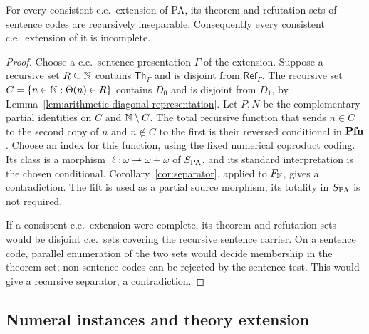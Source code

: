 \begin{corollary}
\label{cor:arithmetic}
\label{thm:arithmetic-comparison-inseparability}
For every consistent c.e.\ extension of PA, its theorem and
refutation sets of sentence codes are recursively inseparable.
Consequently every consistent c.e.\ extension of it is incomplete.
\end{corollary}
\begin{proof}
Choose a c.e.\ sentence presentation $\Gamma$ of the extension.
Suppose a recursive set $R\subseteq\mathbb N$ contains
$\mathsf{Th}_\Gamma$ and is disjoint from
$\mathsf{Ref}_\Gamma$. The recursive set
$C=\{n\in\mathbb N:\Theta(n)\in R\}$
contains $D_0$ and is disjoint from $D_1$, by
Lemma~\ref{lem:arithmetic-diagonal-representation}.
Let $P,N$ be the complementary partial identities on $C$ and
$\mathbb N\setminus C$. The total recursive function that sends
$n\in C$ to the second copy of $n$ and $n\notin C$ to the
first is their reversed conditional in $\mathbf{Pfn}$.
Choose an index for this function, using the fixed numerical
coproduct coding. Its class is a morphism
$\ell:\omega\rightharpoonup\omega+\omega$ of $S_{\mathrm{PA}}$,
and its standard interpretation is the chosen conditional.
Corollary~\ref{cor:separator}, applied to $F_{\mathbb N}$, gives a
contradiction. The lift is used as a partial source morphism;
its totality in $S_{\mathrm{PA}}$ is not required.

If a consistent c.e.\ extension were complete, its theorem and refutation
sets would be disjoint c.e.\ sets covering the recursive
sentence carrier. On a sentence code, parallel enumeration of
the two sets would decide membership in the theorem set;
non-sentence codes can be rejected by the sentence test.
This would give a recursive separator, a contradiction.
\end{proof}







\subsection{Numeral instances and theory extension}

